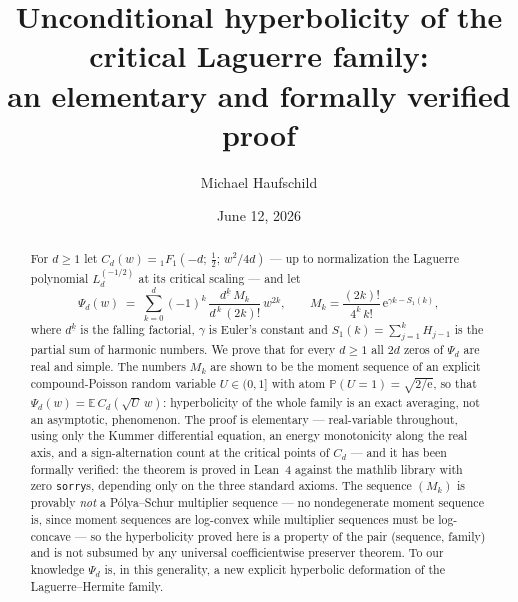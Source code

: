 \documentclass[11pt]{amsart}
\theoremstyle{definition}
\theoremstyle{remark}
\newcommand{\e}{\mathrm{e}}
\newcommand{\E}{\mathbb{E}}
\newcommand{\Prob}{\mathbb{P}}
\newcommand{\hypF}[3]{{}_1F_1\!\left(#1;\,#2;\,#3\right)}
\begin{document}
\title[Hyperbolicity of the critical Laguerre family]{Unconditional
hyperbolicity of the critical Laguerre family:\\ an elementary and
formally verified proof}

\author{Michael Haufschild}

\date{June 12, 2026}

\begin{abstract}
For $d\ge 1$ let
$C_d(w)=\hypF{-d}{\tfrac12}{w^2/4d}$ --- up to normalization the
Laguerre polynomial $L_d^{(-1/2)}$ at its critical scaling --- and let
\[
\Psi_d(w)\;=\;\sum_{k=0}^{d}(-1)^k\,
\frac{d^{\underline{k}}\,M_k}{d^{\,k}\,(2k)!}\,w^{2k},
\qquad
M_k=\frac{(2k)!}{4^k\,k!}\,\e^{\gamma k-S_1(k)},
\]
where $d^{\underline{k}}$ is the falling factorial,
$\gamma$ is Euler's constant and $S_1(k)=\sum_{j=1}^{k}H_{j-1}$ is the
partial sum of harmonic numbers. We prove that for every $d\ge 1$ all
$2d$ zeros of $\Psi_d$ are real and simple. The numbers $M_k$ are
shown to be the moment sequence of an explicit compound-Poisson random
variable $U\in(0,1]$ with atom $\Prob(U=1)=\sqrt{2/\e}$, so that
$\Psi_d(w)=\E\,C_d(\sqrt{U}\,w)$: hyperbolicity of the whole family is
an exact averaging, not an asymptotic, phenomenon. The proof is
elementary --- real-variable throughout, using only the Kummer
differential equation, an energy monotonicity along the real axis, and
a sign-alternation count at the critical points of $C_d$ --- and it has
been formally verified: the theorem is proved in Lean~4 against the
mathlib library with zero \texttt{sorry}s, depending only on the three
standard axioms. The sequence $(M_k)$ is provably \emph{not} a
P\'olya--Schur multiplier sequence --- no nondegenerate moment
sequence is, since moment sequences are log-convex while multiplier
sequences must be log-concave --- so the hyperbolicity proved here is
a property of the pair (sequence, family) and is not subsumed by any
universal coefficientwise preserver theorem. To our knowledge $\Psi_d$
is, in this generality, a new explicit hyperbolic deformation of the
Laguerre--Hermite family.
\end{abstract}

\maketitle
\end{document}
